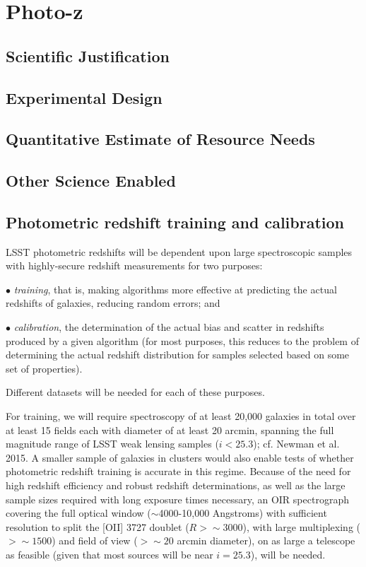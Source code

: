 
\section{Photo-z}
\label{sec:photoz}

\subsection{Scientific Justification}

\subsection{Experimental Design}

\subsection{Quantitative Estimate of Resource Needs}

\subsection{Other Science Enabled}

\subsection{Photometric redshift training and calibration}\label{subsec:training}

LSST photometric redshifts will be dependent upon large spectroscopic samples with highly-secure redshift measurements for two purposes: 

$\bullet$ {\it training}, that is, making algorithms more effective at predicting the actual redshifts of galaxies, reducing random errors; and 

$\bullet$ {\it calibration}, the determination of the actual bias and scatter in redshifts produced by a given algorithm (for most purposes, this reduces to the problem of determining the actual redshift distribution for samples selected based on some set of properties).  

Different datasets will be needed for each of these purposes.

For training, we will require spectroscopy of at least 20,000 galaxies in total over at least 15 fields each with diameter of at least 20 arcmin, spanning the full magnitude range of LSST weak lensing samples ($i<25.3$); cf. Newman et al. 2015.  A smaller sample of galaxies in clusters would also enable tests of whether photometric redshift training is accurate in this regime.  Because of the need for high redshift efficiency and robust redshift determinations, as well as the large sample sizes required with long exposure times necessary, an OIR spectrograph covering the full optical window ($\sim$4000-10,000 Angstroms) with sufficient resolution to split the [OII] 3727 doublet ($R>\sim 3000$), with large multiplexing ($>\sim 1500$) and field of view ($>\sim 20$ arcmin diameter), on as large a telescope as feasible (given that most sources will be near $i=25.3$), will be needed.  

